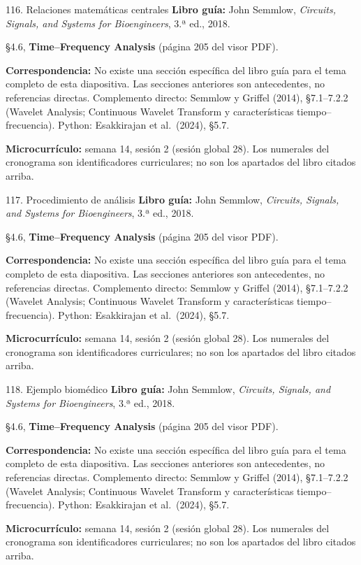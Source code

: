 \documentclass[
  10pt,
  ignorenonframetext,
  aspectratio=169,
  spanish,
]{beamer}
\begin{document}
\begin{frame}{116. Relaciones matemáticas centrales}
\label{relaciones-matemuxe1ticas-centrales-7}
\textbf{Libro guía:} John Semmlow, \emph{Circuits, Signals, and Systems
for Bioengineers}, 3.ª ed., 2018.

§4.6, \textbf{Time--Frequency Analysis} (página 205 del visor PDF).

\textbf{Correspondencia:} No existe una sección específica del libro
guía para el tema completo de esta diapositiva. Las secciones anteriores
son antecedentes, no referencias directas. Complemento directo: Semmlow
y Griffel (2014), §7.1--7.2.2 (Wavelet Analysis; Continuous Wavelet
Transform y características tiempo--frecuencia). Python: Esakkirajan et
al.~(2024), §5.7.

\textbf{Microcurrículo:} semana 14, sesión 2 (sesión global 28). Los
numerales del cronograma son identificadores curriculares; no son los
apartados del libro citados arriba.
\end{frame}

\begin{frame}{117. Procedimiento de análisis}
\label{procedimiento-de-anuxe1lisis-7}
\textbf{Libro guía:} John Semmlow, \emph{Circuits, Signals, and Systems
for Bioengineers}, 3.ª ed., 2018.

§4.6, \textbf{Time--Frequency Analysis} (página 205 del visor PDF).

\textbf{Correspondencia:} No existe una sección específica del libro
guía para el tema completo de esta diapositiva. Las secciones anteriores
son antecedentes, no referencias directas. Complemento directo: Semmlow
y Griffel (2014), §7.1--7.2.2 (Wavelet Analysis; Continuous Wavelet
Transform y características tiempo--frecuencia). Python: Esakkirajan et
al.~(2024), §5.7.

\textbf{Microcurrículo:} semana 14, sesión 2 (sesión global 28). Los
numerales del cronograma son identificadores curriculares; no son los
apartados del libro citados arriba.
\end{frame}

\begin{frame}{118. Ejemplo biomédico}
\label{ejemplo-biomuxe9dico-7}
\textbf{Libro guía:} John Semmlow, \emph{Circuits, Signals, and Systems
for Bioengineers}, 3.ª ed., 2018.

§4.6, \textbf{Time--Frequency Analysis} (página 205 del visor PDF).

\textbf{Correspondencia:} No existe una sección específica del libro
guía para el tema completo de esta diapositiva. Las secciones anteriores
son antecedentes, no referencias directas. Complemento directo: Semmlow
y Griffel (2014), §7.1--7.2.2 (Wavelet Analysis; Continuous Wavelet
Transform y características tiempo--frecuencia). Python: Esakkirajan et
al.~(2024), §5.7.

\textbf{Microcurrículo:} semana 14, sesión 2 (sesión global 28). Los
numerales del cronograma son identificadores curriculares; no son los
apartados del libro citados arriba.
\end{frame}
\end{document}
